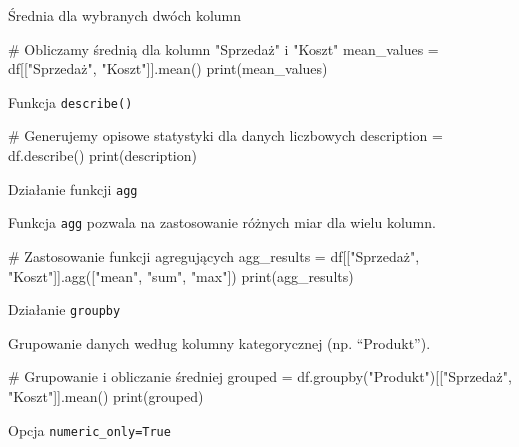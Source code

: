 \documentclass[
  polish,
  letterpaper,
  DIV=11,
  numbers=noendperiod]{scrreprt}
\newenvironment{Shaded}{\begin{snugshade}}{\end{snugshade}}
\newcommand{\BuiltInTok}[1]{\textcolor[rgb]{0.00,0.23,0.31}{#1}}
\newcommand{\CommentTok}[1]{\textcolor[rgb]{0.37,0.37,0.37}{#1}}
\newcommand{\NormalTok}[1]{\textcolor[rgb]{0.00,0.23,0.31}{#1}}
\newcommand{\OperatorTok}[1]{\textcolor[rgb]{0.37,0.37,0.37}{#1}}
\newcommand{\StringTok}[1]{\textcolor[rgb]{0.13,0.47,0.30}{#1}}
\begin{document}
Średnia dla wybranych dwóch kolumn

\begin{Shaded}
\begin{Highlighting}[]
\CommentTok{\# Obliczamy średnią dla kolumn "Sprzedaż" i "Koszt"}
\NormalTok{mean\_values }\OperatorTok{=}\NormalTok{ df[[}\StringTok{"Sprzedaż"}\NormalTok{, }\StringTok{"Koszt"}\NormalTok{]].mean()}
\BuiltInTok{print}\NormalTok{(mean\_values)}
\end{Highlighting}
\end{Shaded}

Funkcja \texttt{describe()}

\begin{Shaded}
\begin{Highlighting}[]
\CommentTok{\# Generujemy opisowe statystyki dla danych liczbowych}
\NormalTok{description }\OperatorTok{=}\NormalTok{ df.describe()}
\BuiltInTok{print}\NormalTok{(description)}
\end{Highlighting}
\end{Shaded}

Działanie funkcji \texttt{agg}

Funkcja \texttt{agg} pozwala na zastosowanie różnych miar dla wielu
kolumn.

\begin{Shaded}
\begin{Highlighting}[]
\CommentTok{\# Zastosowanie funkcji agregujących}
\NormalTok{agg\_results }\OperatorTok{=}\NormalTok{ df[[}\StringTok{"Sprzedaż"}\NormalTok{, }\StringTok{"Koszt"}\NormalTok{]].agg([}\StringTok{"mean"}\NormalTok{, }\StringTok{"sum"}\NormalTok{, }\StringTok{"max"}\NormalTok{])}
\BuiltInTok{print}\NormalTok{(agg\_results)}
\end{Highlighting}
\end{Shaded}

Działanie \texttt{groupby}

Grupowanie danych według kolumny kategorycznej (np. ``Produkt'').

\begin{Shaded}
\begin{Highlighting}[]
\CommentTok{\# Grupowanie i obliczanie średniej}
\NormalTok{grouped }\OperatorTok{=}\NormalTok{ df.groupby(}\StringTok{"Produkt"}\NormalTok{)[[}\StringTok{"Sprzedaż"}\NormalTok{, }\StringTok{"Koszt"}\NormalTok{]].mean()}
\BuiltInTok{print}\NormalTok{(grouped)}
\end{Highlighting}
\end{Shaded}

Opcja \texttt{numeric\_only=True}
\end{document}

